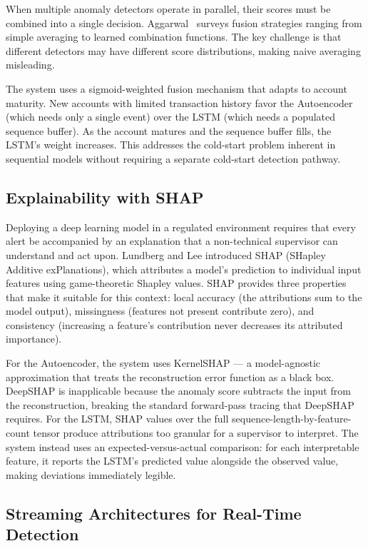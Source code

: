When multiple anomaly detectors operate in parallel, their scores must
be combined into a single decision. Aggarwal~\cite{aggarwal2017}
surveys fusion strategies ranging from simple averaging to learned
combination functions. The key challenge is that different detectors
may have different score distributions, making naive averaging
misleading.

The system uses a sigmoid-weighted fusion mechanism that adapts to
account maturity. New accounts with limited transaction history favor
the Autoencoder (which needs only a single event) over the LSTM
(which needs a populated sequence buffer). As the account matures
and the sequence buffer fills, the LSTM's weight increases. This
addresses the cold-start problem inherent in sequential models without
requiring a separate cold-start detection pathway.

\subsection{Explainability with SHAP}

Deploying a deep learning model in a regulated environment requires
that every alert be accompanied by an explanation that a non-technical
supervisor can understand and act upon. Lundberg and
Lee introduced SHAP (SHapley Additive
exPlanations), which attributes a model's prediction to individual
input features using game-theoretic Shapley values. SHAP provides
three properties that make it suitable for this context: local
accuracy (the attributions sum to the model output), missingness
(features not present contribute zero), and consistency (increasing a
feature's contribution never decreases its attributed importance).

For the Autoencoder, the system uses KernelSHAP --- a model-agnostic
approximation that treats the reconstruction error function as a black
box. DeepSHAP is inapplicable because the anomaly score subtracts the
input from the reconstruction, breaking the standard forward-pass
tracing that DeepSHAP requires. For the LSTM, SHAP values over the
full sequence-length-by-feature-count tensor produce attributions too
granular for a supervisor to interpret. The system instead uses an
expected-versus-actual comparison: for each interpretable feature, it
reports the LSTM's predicted value alongside the observed value,
making deviations immediately legible.

\subsection{Streaming Architectures for Real-Time Detection}

